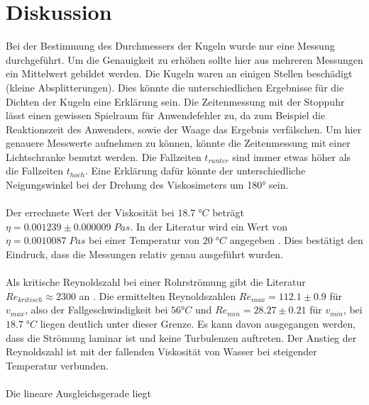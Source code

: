 \section{Diskussion}
\label{sec:Diskussion}
Bei der Bestimmung des Durchmessers der Kugeln wurde nur eine Messung durchgeführt. Um die Genauigkeit zu erhöhen sollte hier aus mehreren Messungen ein Mittelwert 
gebildet werden. Die Kugeln waren an einigen Stellen beschädigt (kleine Absplitterungen). Dies könnte die unterschiedlichen Ergebnisse für die Dichten der Kugeln eine Erklärung sein.
Die Zeitenmessung mit der Stoppuhr lässt einen gewissen Spielraum für Anwendefehler zu, da zum Beispiel die Reaktionszeit des Anwenders, sowie der Waage das Ergebnis verfälschen.
Um hier genauere Messwerte aufnehmen zu können, könnte die Zeitenmessung mit einer Lichtschranke benutzt werden. 
Die Fallzeiten $t_{runter}$ sind immer etwas höher als die Fallzeiten $t_{hoch}$. Eine Erklärung dafür könnte der unterschiedliche Neigungswinkel bei der Drehung des 
Viskosimeters um 180° sein.
\\
\\
Der errechnete Wert der Viskosität bei $18.7\;\unit{°C}$ beträgt $\eta = 0.001239\pm0.000009\;\unit{Pa s}$. In der Literatur wird ein Wert von $\eta = 0.0010087\;\unit{Pa s}$ bei einer
Temperatur von $20\;\unit{°C}$ angegeben \cite{viskosität_wasser}. Dies bestätigt den Eindruck, dass die Messungen relativ genau ausgeführt wurden. 
\\
\\
Als kritische Reynoldszahl bei einer Rohrströmung gibt die Literatur $Re_{kritisch} \approx 2300$ an \cite{reynold_kritisch}. Die ermittelten Reynoldszahlen $Re_{max} = 112.1 \pm 0.9$ für $v_{max}$, also der Fallgeschwindigkeit
bei $56\unit{°C}$ und $Re_{min} = 28.27 \pm 0.21$ für $v_{min}$, bei $18.7\;\unit{°C}$ liegen deutlich unter dieser Grenze. Es kann davon ausgegangen werden, dass die Strömung laminar ist und keine 
Turbulenzen auftreten.
Der Anstieg der Reynoldszahl ist mit der fallenden Viskosität von Wasser bei steigender Temperatur verbunden. 
\\
\\
Die lineare Ausgleichsgerade liegt 





\newpage